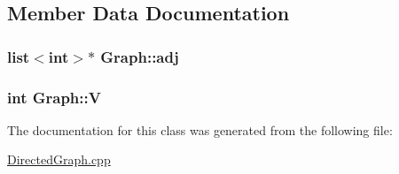 \subsection{Member Data Documentation}
\subsubsection[{\texorpdfstring{adj}{adj}}]{\setlength{\rightskip}{0pt plus 5cm}list$<$int$>$$\ast$ Graph\+::adj\hspace{0.3cm}{\ttfamily [private]}}\hypertarget{classGraph_a04ab9c17ad31aa036def8db0f88b035b}{}\label{classGraph_a04ab9c17ad31aa036def8db0f88b035b}
\subsubsection[{\texorpdfstring{V}{V}}]{\setlength{\rightskip}{0pt plus 5cm}int Graph\+::V\hspace{0.3cm}{\ttfamily [private]}}\hypertarget{classGraph_a2b722f7cfa7a21e4cb5fae488b3d4dcc}{}\label{classGraph_a2b722f7cfa7a21e4cb5fae488b3d4dcc}


The documentation for this class was generated from the following file\+:\begin{DoxyCompactItemize}
\item 
\hyperlink{DirectedGraph_8cpp}{Directed\+Graph.\+cpp}\end{DoxyCompactItemize}
